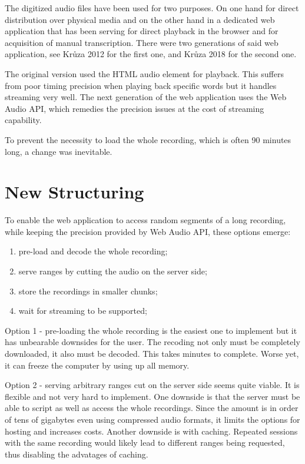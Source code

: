 The digitized audio files have been used for two purposes. On one hand for
direct distribution over physical media and on the other hand in a dedicated web
application that has been serving for direct playback in the browser and for
acquisition of manual transcription. There were two generations of said web
application, see Krůza 2012\cite{kruuza2012making} for the first one, and Krůza
2018\cite{biblio:KrKuSecondGenerationWeb2018} for the second one.

The original version used the HTML audio element for playback. This suffers from
poor timing precision when playing back specific words but it handles streaming
very well. The next generation of the web application uses the Web Audio API,
which remedies the precision issues at the cost of streaming capability.

To prevent the necessity to load the whole recording, which is often 90 minutes
long, a change was inevitable.

\section{New Structuring}

To enable the web application to access random segments of a long recording,
while keeping the precision provided by Web Audio API, these options emerge:

\begin{enumerate}
\item{pre-load and decode the whole recording;}
\item{serve ranges by cutting the audio on the server side;}
\item{store the recordings in smaller chunks;}
\item{wait for streaming to be supported;}
\end{enumerate}

Option 1 - pre-loading the whole recording is the easiest one to implement but
it has unbearable downsides for the user. The recoding not only must be
completely downloaded, it also must be decoded. This takes minutes to complete.
Worse yet, it can freeze the computer by using up all memory.

Option 2 - serving arbitrary ranges cut on the server side seems quite viable.
It is flexible and not very hard to implement. One downside is that the server
must be able to script as well as access the whole recordings. Since the amount
is in order of tens of gigabytes even using compressed audio formats, it limits
the options for hosting and increases costs. Another downside is with caching.
Repeated sessions with the same recording would likely lead to different ranges
being requested, thus disabling the advatages of caching.

